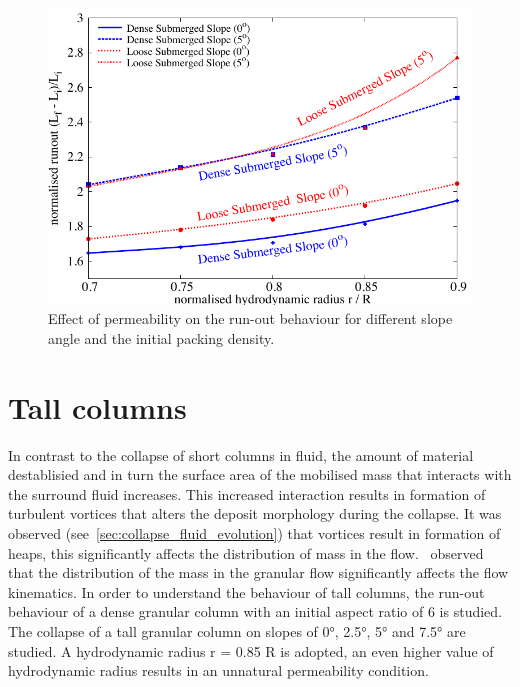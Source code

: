 \begin{figure}
\centering
\includegraphics[width=0.97\columnwidth]{Perm_Runout_slope}
\caption{Effect of permeability on the run-out behaviour for different slope 
angle and the initial packing density.}
\label{fig:Perm_Runout_slope}
\end{figure}

\clearpage

\section{Tall columns}

In contrast to the collapse of short columns in fluid, the amount of material 
destablisied and in turn the surface area of the mobilised mass that interacts 
with the surround fluid increases. This increased interaction results in 
formation of turbulent vortices that alters the deposit morphology during the 
collapse. It was observed (see~\cref{sec:collapse_fluid_evolution}) that 
vortices result in formation of heaps, this significantly affects the 
distribution of mass in the flow.~\citet{Staron2007a} observed that the 
distribution of the mass in the granular flow significantly affects the flow 
kinematics. In order to understand the behaviour of tall columns, the run-out 
behaviour of a dense granular column with an initial aspect ratio of 6 is 
studied. The collapse of a tall granular column on slopes of 0\si{\degree}, 
2.5\si{\degree}, 5\si{\degree} and 7.5\si{\degree} are studied. A hydrodynamic 
radius r = 0.85 R is adopted, an even higher value of hydrodynamic radius 
results in an unnatural permeability condition. 

